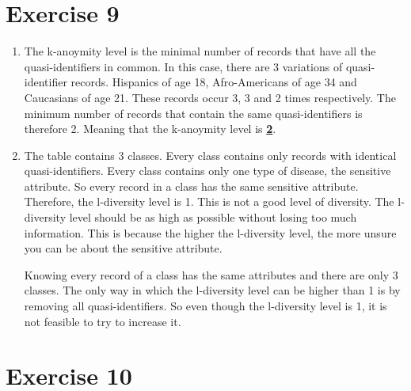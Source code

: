 \documentclass[twoside, a4paper, fleqn, reqno]{article}
\begin{document}
\section*{Exercise 9}

\begin{enumerate}
	\item The k-anoymity level is the minimal number of records that have all the quasi-identifiers in common.
	In this case, there are 3 variations of quasi-identifier records. Hispanics of age 18,
	Afro-Americans of age 34 and Caucasians of age 21.
	These records occur 3, 3 and 2 times respectively. The minimum
	number of records that contain the same quasi-identifiers is therefore 2. Meaning that the k-anoymity level
	is \textbf{\underline{2}}.\\
	\item The table contains 3 classes. Every class contains only records with identical quasi-identifiers.
	Every class contains only one type of disease, the sensitive attribute. So every record
	in a class has the same sensitive attribute. Therefore, the l-diversity level is 1.
	This is not a good level of diversity. The l-diversity level should be as high as possible without
	losing too much information. This is because the higher the l-diversity level, the more unsure
	you can be about the sensitive attribute.

	Knowing every record of a class has the same attributes and there are only 3 classes.
	The only way in which the l-diversity level can be higher than 1 is by removing all quasi-identifiers.
	So even though the l-diversity level is 1, it is not feasible to try to increase it.
	
\end{enumerate}

\section*{Exercise 10}
\end{document}
